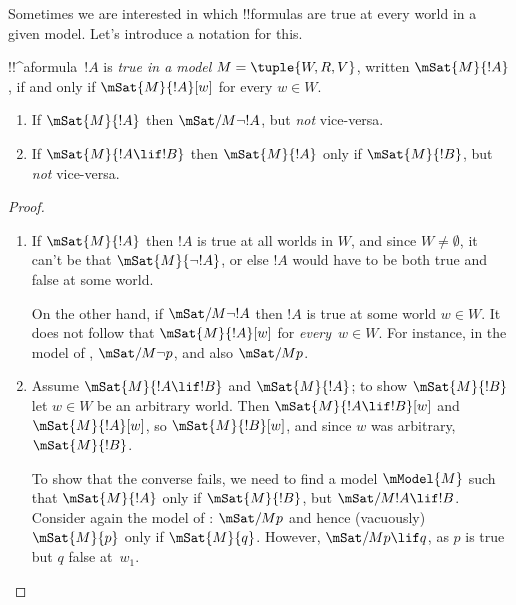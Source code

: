 \documentclass[../../../include/open-logic-section]{subfiles}
\begin{document}


Sometimes we are interested in which !!{formula}s are true at every world
in a given model. Let's introduce a notation for this.

\begin{defn}
  !!^a{formula}~$!A$ is \emph{true in a model} $M = \tuple{W, R,
    V}$, written $\mSat{M}{!A}$, if and only if $\mSat{M}{!A}[w]$
  for every $w \in W$.
\end{defn}

\begin{prop}
  \begin{enumerate}
  \item If $\mSat{M}{!A}$ then $\mSat/{M}{\lnot !A}$, but \emph{not}
    vice-versa.
  \item If $\mSat{M}{!A \lif !B}$ then $\mSat{M}{!A}$ only if
    $\mSat{M}{!B}$, but \emph{not} vice-versa.
  \end{enumerate}
\end{prop}

\begin{proof}
  \begin{enumerate}
  \item If $\mSat{M}{!A}$ then $!A$ is true at all worlds in $W$, and
    since $W \neq \emptyset$, it can't be that $\mSat{M}{\lnot!A}$, or
    else $!A$ would have to be both true and false at some
    world.

    On the other hand, if $\mSat/{M}{\lnot !A}$ then $!A$ is true at
    some world $w \in W$. It does not follow that $\mSat{M}{!A}[w]$
    for \emph{every}~$w \in W$. For instance, in the model of
    , $\mSat/{M}{\lnot p}$, and also $\mSat/{M}{p}$.
  \item Assume $\mSat{M}{!A \lif !B}$ and $\mSat{M}{!A}$; to show
    $\mSat{M}{!B}$ let $w \in W$ be an arbitrary world. Then
    $\mSat{M}{!A \lif !B}[w]$ and $\mSat{M}{!A}[w]$, so
    $\mSat{M}{!B}[w]$, and since $w$ was arbitrary,
    $\mSat{M}{!B}$.

    To show that the converse fails, we need to find a model
    $\mModel{M}$ such that $\mSat{M}{!A}$ only if $\mSat{M}{!B}$, but
    $\mSat/{M}{!A \lif !B}$. Consider again the model of
    : $\mSat/{M}{p}$ and hence (vacuously)
    $\mSat{M}{p}$ only if $\mSat{M}{q}$. However, $\mSat/{M}{p \lif
      q}$, as $p$ is true but $q$ false at~$w_1$.
  \end{enumerate}
\end{proof}
\end{document}
